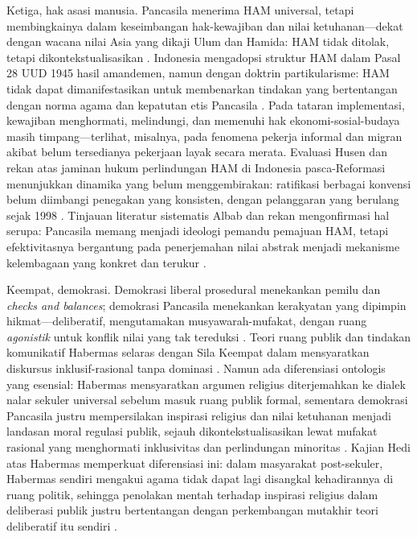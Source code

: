 \documentclass[journal]{IEEEtran}
\begin{document}
Ketiga, hak asasi manusia. Pancasila menerima HAM universal, tetapi membingkainya dalam keseimbangan hak-kewajiban dan nilai ketuhanan---dekat dengan wacana nilai Asia yang dikaji Ulum dan Hamida: HAM tidak ditolak, tetapi dikontekstualisasikan \cite{ulumhamida2018}. Indonesia mengadopsi struktur HAM dalam Pasal 28 UUD 1945 hasil amandemen, namun dengan doktrin partikularisme: HAM tidak dapat dimanifestasikan untuk membenarkan tindakan yang bertentangan dengan norma agama dan kepatutan etis Pancasila \cite{assiddiqie2006}. Pada tataran implementasi, kewajiban menghormati, melindungi, dan memenuhi hak ekonomi-sosial-budaya masih timpang---terlihat, misalnya, pada fenomena pekerja informal dan migran akibat belum tersedianya pekerjaan layak secara merata. Evaluasi Husen dan rekan atas jaminan hukum perlindungan HAM di Indonesia pasca-Reformasi menunjukkan dinamika yang belum menggembirakan: ratifikasi berbagai konvensi belum diimbangi penegakan yang konsisten, dengan pelanggaran yang berulang sejak 1998 \cite{husen2023}. Tinjauan literatur sistematis Albab dan rekan mengonfirmasi hal serupa: Pancasila memang menjadi ideologi pemandu pemajuan HAM, tetapi efektivitasnya bergantung pada penerjemahan nilai abstrak menjadi mekanisme kelembagaan yang konkret dan terukur \cite{albab2025}.

Keempat, demokrasi. Demokrasi liberal prosedural menekankan pemilu dan \textit{checks and balances}; demokrasi Pancasila menekankan kerakyatan yang dipimpin hikmat---deliberatif, mengutamakan musyawarah-mufakat, dengan ruang \textit{agonistik} untuk konflik nilai yang tak tereduksi \cite{madung2016,habermas1996,mouffe2005}. Teori ruang publik dan tindakan komunikatif Habermas selaras dengan Sila Keempat dalam mensyaratkan diskursus inklusif-rasional tanpa dominasi \cite{habermas1996}. Namun ada diferensiasi ontologis yang esensial: Habermas mensyaratkan argumen religius diterjemahkan ke dialek nalar sekuler universal sebelum masuk ruang publik formal, sementara demokrasi Pancasila justru mempersilakan inspirasi religius dan nilai ketuhanan menjadi landasan moral regulasi publik, sejauh dikontekstualisasikan lewat mufakat rasional yang menghormati inklusivitas dan perlindungan minoritas \cite{madungmere2021,maarof2018}. Kajian Hedi atas Habermas memperkuat diferensiasi ini: dalam masyarakat post-sekuler, Habermas sendiri mengakui agama tidak dapat lagi disangkal kehadirannya di ruang politik, sehingga penolakan mentah terhadap inspirasi religius dalam deliberasi publik justru bertentangan dengan perkembangan mutakhir teori deliberatif itu sendiri \cite{hedi2019,habermas1996}.
\end{document}
